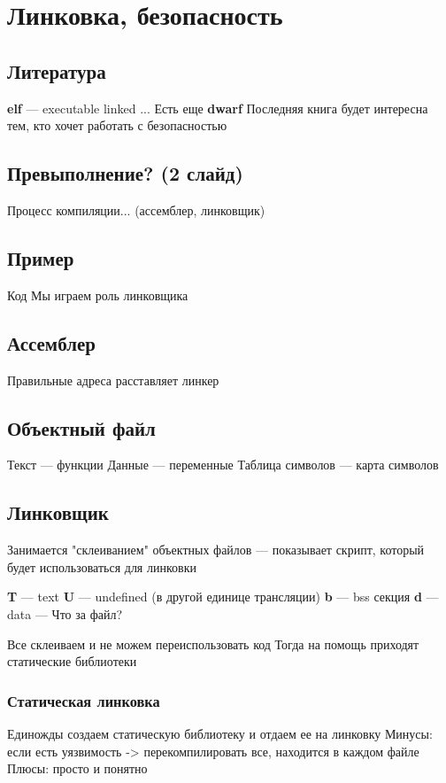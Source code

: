 \chapter{Линковка, безопасность}

\section{Литература}
\textbf{elf} --- executable linked ...
Есть еще \textbf{dwarf}
Последняя книга будет интересна тем, кто хочет работать с безопасностью

\section{Превыполнение? (2 слайд)}
Процесс компиляции... (ассемблер, линковщик)

\section{Пример}
Код
Мы играем роль линковщика

\section{Ассемблер}
Правильные адреса расставляет линкер

\section{Объектный файл}
Текст --- функции
Данные --- переменные
Таблица символов --- карта символов

\section{Линковщик}
Занимается "склеиванием" объектных файлов
 --- показывает скрипт, который будет использоваться для линковки

\textbf{T} --- text
\textbf{U} --- undefined (в другой единице трансляции)
\textbf{b} --- bss секция
\textbf{d} --- data
 --- Что за файл?

Все склеиваем и не можем переиспользовать код
Тогда на помощь приходят статические библиотеки

\subsection{Статическая линковка}
Единожды создаем статическую библиотеку и отдаем ее на линковку
Минусы: если есть уязвимость -> перекомпилировать все, находится в каждом файле
Плюсы: просто и понятно

